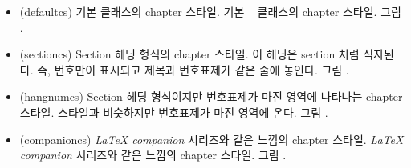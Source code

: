\begin{itemize}
\item[\cstyle{default}] 
\glossary(defaultcs)%
  {}%
  {기본  클래스의 chapter 스타일.}
기본 \ltx\  클래스의 chapter 스타일. 그림 .

\item[\cstyle{section}] 
\glossary(sectioncs)%
  {}%
  {Section 헤딩 형식의 chapter 스타일.}
이 헤딩은 section 처럼 식자된다.
즉, 번호만이 표시되고 제목과 번호표제가 같은 줄에 놓인다. 그림 .

\item[\cstyle{hangnum}] 
\glossary(hangnumcs)%
  {}%
  {Section 헤딩 형식이지만 번호표제가 마진 영역에 나타나는 chapter 스타일.}
 스타일과 비슷하지만 번호표제가 마진 영역에 온다. 그림 .

\item[\cstyle{companion}]
\glossary(companioncs)%
  {}%
  {\textit{LaTeX companion} 시리즈와 같은 느낌의 chapter 스타일.}
\textit{LaTeX companion} 시리즈와 같은 느낌의 chapter 스타일. 그림 .


\end{itemize}

